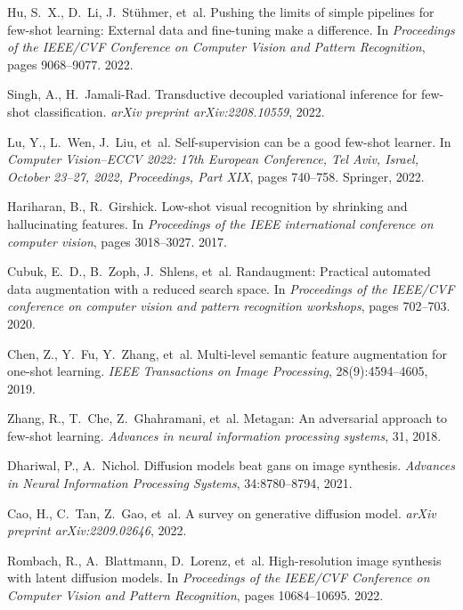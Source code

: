 \documentclass{article}
\begin{document}
\begin{thebibliography}{10}
	Hu, S.~X., D.~Li, J.~St{\"u}hmer, et~al.
	\newblock Pushing the limits of simple pipelines for few-shot learning:
	External data and fine-tuning make a difference.
	\newblock In \emph{Proceedings of the IEEE/CVF Conference on Computer Vision
		and Pattern Recognition}, pages 9068--9077. 2022.
	
	Singh, A., H.~Jamali-Rad.
	\newblock Transductive decoupled variational inference for few-shot
	classification.
	\newblock \emph{arXiv preprint arXiv:2208.10559}, 2022.
	
	Lu, Y., L.~Wen, J.~Liu, et~al.
	\newblock Self-supervision can be a good few-shot learner.
	\newblock In \emph{Computer Vision--ECCV 2022: 17th European Conference, Tel
		Aviv, Israel, October 23--27, 2022, Proceedings, Part XIX}, pages 740--758.
	Springer, 2022.
	
	Hariharan, B., R.~Girshick.
	\newblock Low-shot visual recognition by shrinking and hallucinating features.
	\newblock In \emph{Proceedings of the IEEE international conference on computer
		vision}, pages 3018--3027. 2017.
	
	Cubuk, E.~D., B.~Zoph, J.~Shlens, et~al.
	\newblock Randaugment: Practical automated data augmentation with a reduced
	search space.
	\newblock In \emph{Proceedings of the IEEE/CVF conference on computer vision
		and pattern recognition workshops}, pages 702--703. 2020.
	
	Chen, Z., Y.~Fu, Y.~Zhang, et~al.
	\newblock Multi-level semantic feature augmentation for one-shot learning.
	\newblock \emph{IEEE Transactions on Image Processing}, 28(9):4594--4605, 2019.
	
	Zhang, R., T.~Che, Z.~Ghahramani, et~al.
	\newblock Metagan: An adversarial approach to few-shot learning.
	\newblock \emph{Advances in neural information processing systems}, 31, 2018.
	
	Dhariwal, P., A.~Nichol.
	\newblock Diffusion models beat gans on image synthesis.
	\newblock \emph{Advances in Neural Information Processing Systems},
	34:8780--8794, 2021.
	
	Cao, H., C.~Tan, Z.~Gao, et~al.
	\newblock A survey on generative diffusion model.
	\newblock \emph{arXiv preprint arXiv:2209.02646}, 2022.
	
	Rombach, R., A.~Blattmann, D.~Lorenz, et~al.
	\newblock High-resolution image synthesis with latent diffusion models.
	\newblock In \emph{Proceedings of the IEEE/CVF Conference on Computer Vision
		and Pattern Recognition}, pages 10684--10695. 2022.
	

\end{thebibliography}
\end{document}
